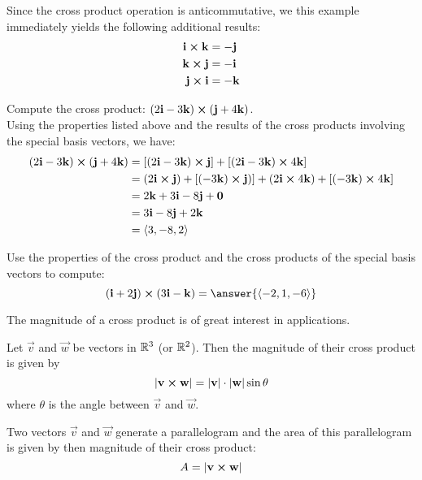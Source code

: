 \documentclass[handout]{ximera}
\begin{document}
\begin{remark}
Since the cross product operation is anticommutative, we this example immediately yields the following additional results:
\begin{align*}
\mathbf{i} \boldsymbol\times \mathbf{k} &= \mathbf{-j}\\
\mathbf{k} \boldsymbol\times \mathbf{j} &= \mathbf{-i}\\
\mathbf{j} \boldsymbol\times \mathbf{i} &= \mathbf{-k}
\end{align*}
\end{remark}

\begin{example}
Compute the cross product: $(2\mathbf{i} - 3\mathbf{k}) \boldsymbol\times (\mathbf{j} + 4\mathbf{k})$.\\
Using the properties listed above and the results of the cross products involving the special basis vectors, we have:
\begin{align*}
(2\mathbf{i} - 3\mathbf{k}) \boldsymbol\times (\mathbf{j} + 4\mathbf{k}) & = [(2\mathbf{i} - 3\mathbf{k}) \boldsymbol\times \mathbf{j}] + [(2\mathbf{i} - 3\mathbf{k}) \boldsymbol\times   4\mathbf{k}]\\
                                  &= (2\mathbf{i} \boldsymbol\times \mathbf{j}) + [(-3\mathbf{k}) \boldsymbol\times \mathbf{j})] +(2\mathbf{i} \boldsymbol\times   4\mathbf{k}) + [ (- 3\mathbf{k}) \boldsymbol\times   4\mathbf{k}]\\
                                  &= 2\mathbf{k} + 3 \mathbf{i} -8\mathbf{j} + \mathbf{0}\\
                                  &= 3\mathbf{i} - 8\mathbf{j} +2\mathbf{k}\\
                                  &= \left\langle 3, -8, 2\right\rangle
\end{align*}
\end{example}

\begin{problem}
Use the properties of the cross product and the cross products of the special basis vectors to compute: 
\[
(\vec{i} + 2\vec{j}) \cross (3\vec{i} - \vec{k}) = \answer{\vector{-2,1,-6}}
\]
\end{problem}



The magnitude of a cross product is of great interest in applications.
\begin{proposition}
Let $\vec{v}$ and $\vec{w}$ be vectors in $\mathbb R^3$ (or $\mathbb R^2$). Then the magnitude of their cross product is given by
\[
|\mathbf{v} \boldsymbol\times \mathbf{w}| = |\mathbf{v}| \cdot |\mathbf{w}| \sin \theta
\]
where $\theta$ is the angle between $\vec{v}$ and $\vec{w}$.
\end{proposition}

Two vectors $\vec{v}$ and $\vec{w}$ generate a parallelogram and the area of this parallelogram is given by then magnitude of their cross product:
\[
A = |\mathbf{v} \boldsymbol\times \mathbf{w}|
\]
\end{document}
